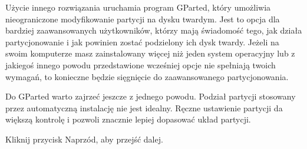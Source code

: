 \textcolor{ubuntu_orange}{Użycie innego rozwiązania} uruchamia program GParted, który umożliwia nieograniczone modyfikowanie partycji na dysku twardym. Jest to opcja dla bardziej zaawansowanych użytkowników, którzy mają świadomość tego, jak działa partycjonowanie i jak powinien zostać podzielony ich dysk twardy. Jeżeli na swoim komputerze masz zainstalowany więcej niż jeden system operacyjny lub z jakiegoś innego powodu przedstawione wcześniej opcje nie spełniają twoich wymagań, to konieczne będzie sięgnięcie do zaawansowanego partycjonowania.

Do GParted warto zajrzeć jeszcze z jednego powodu. Podział partycji stosowany przez automatyczną instalację nie jest idealny. Ręczne ustawienie partycji da większą kontrolę i pozwoli znacznie lepiej dopasować układ partycji.
\begin{flushright}
Kliknij przycisk \textcolor{ubuntu_orange}{Naprzód}, aby przejść dalej.
\end{flushright}
\clearpage
